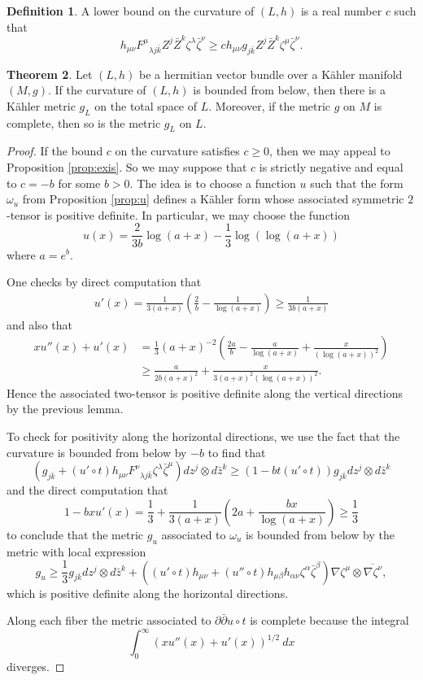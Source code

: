 \documentclass{article}
\numberwithin{equation}{section}
\theoremstyle{definition}
\newtheorem{definition}{Definition}[section]
\theoremstyle{theorem}
\newtheorem{theorem}[definition]{Theorem}
\newcommand{\ddb}{\partial\bar{\partial}}
\begin{document}
\begin{definition}
A lower bound on the curvature of $(L,h)$ is a real number $c$ such that 
\[
h_{\mu \nu} F^\mu{}_{\lambda j \bar{k}} Z^j \bar{Z}^k \zeta^\lambda \bar{\zeta}^\nu \geqslant c h_{\mu \nu} g_{j\bar{k}} Z^j \bar{Z}^k \zeta^\mu \bar{\zeta}^\nu.
\]
\end{definition}

\begin{theorem}
Let $(L,h)$ be a hermitian vector bundle over a K\"ahler manifold $(M,g)$. If the curvature of $(L,h)$ is bounded from below, then there is a K\"ahler metric $g_L$ on the total space of $L$. Moreover, if the metric $g$ on $M$ is complete, then so is the metric $g_L$ on $L$. 
\end{theorem}

\begin{proof}
If the bound $c$ on the curvature satisfies $c \geqslant 0$, then we may appeal to Proposition \ref{prop:exis}. So we may suppose that $c$ is strictly negative and equal to $c = -b$ for some $b > 0$. The idea is to choose a function $u$ such that the form $\omega_u$ from Proposition \ref{prop:u} defines a K\"ahler form whose associated symmetric $2$-tensor is positive definite. In particular, we may choose the function  
\[
u(x) = \frac{2}{3b} \log(a + x) - \frac{1}{3}\log(\log(a + x))
\]
where $a = e^b$. 

One checks by direct computation that 
\begin{align*}
u'(x) = \frac{1}{3(a + x)} \left(\frac{2}{b} - \frac{1}{\log(a + x)}\right) \geqslant \frac{1}{3b(a + x)}
\end{align*}
and also that 
\begin{align*}
xu''(x) + u'(x) &= \frac{1}{3} (a + x)^{-2} \left(\frac{2a}{b} - \frac{a}{\log(a + x)} + \frac{x}{(\log(a + x))^2}\right) \\
&\geqslant \frac{a}{2b(a + x)^2} + \frac{x}{3(a + x)^2 (\log(a + x))^2}.
\end{align*}
Hence the associated two-tensor is positive definite along the vertical directions by the previous lemma. 

To check for positivity along the horizontal directions, we use the fact that the curvature is bounded from below by $-b$ to find that 
\[
(g_{j\bar{k}} + (u' \circ t) h_{\mu \nu} F^{\nu}{}_{\lambda j \bar{k}} \zeta^\lambda \bar{\zeta}^\mu) dz^j \otimes d\bar{z}^k \geqslant (1 - b t (u' \circ t)) g_{j \bar{k}}dz^j \otimes d\bar{z}^k 
\]
and the direct computation that
\[
1 - b x u'(x) = \frac{1}{3} + \frac{1}{3(a + x)} \left(2a + \frac{bx}{\log(a + x)}\right) \geqslant \frac{1}{3}
\]
to conclude that the metric $g_u$ associated to $\omega_u$ is bounded from below by the metric with local expression  
\[
g_u \geqslant \frac{1}{3} g_{j \bar{k}} dz^j \otimes d\bar{z}^k +((u' \circ t)h_{\mu \nu} + (u'' \circ t) h_{\mu \beta} h_{\alpha \nu} \zeta^\alpha \bar{\zeta}^\beta) \nabla \zeta^\mu \otimes \overline{\nabla \zeta^\nu},
\]
which is positive definite along the horizontal directions. 

Along each fiber the metric associated to $\ddb u \circ t$ is complete because the integral 
\[
\int_0^\infty (x u''(x) + u'(x))^{1/2} \: dx
\] 
diverges. 
\end{proof}
\end{document}
